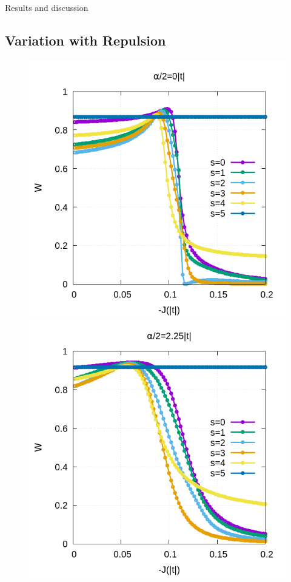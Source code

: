 \documentclass[12pt,twoside]{report}
\begin{document}
\begin{chapter}{Results and discussion}
	
	\subsection{Variation with Repulsion}

	\begin{figure}[h!]
		\centering
		\hspace{-2cm}
		\begin{minipage}{0.4\textwidth}
			\includegraphics[scale=0.35]{W_vs_J_sites_2-xrep-01.png}
		\end{minipage}
		\hspace{2cm}
		\begin{minipage}{0.4\textwidth}
			\includegraphics[scale=0.35]{W_vs_J_sites_2-xrep-225.png}

\end{minipage}
\end{figure}
\end{chapter}
\end{document}
